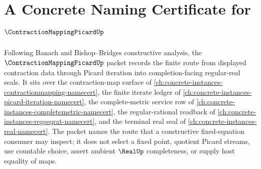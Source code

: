 \chapter{A Concrete Naming Certificate for $\ContractionMappingPicardUp$}
\label{ch:concrete-instances-contraction-mapping-picard-namecert}

Following Banach and Bishop--Bridges constructive analysis, the $\ContractionMappingPicardUp$ packet records the finite route from displayed contraction data through Picard iteration into completion-facing regular-real seals. It sits over the contraction-map surface of \autoref{ch:concrete-instances-contractionmapping-namecert}, the finite iterate ledger of \autoref{ch:concrete-instances-picard-iteration-namecert}, the complete-metric service row of \autoref{ch:concrete-instances-completemetric-namecert}, the regular-rational readback of \autoref{ch:concrete-instances-regseqrat-namecert}, and the terminal real seal of \autoref{ch:concrete-instances-real-namecert}. The packet names the route that a constructive fixed-equation consumer may inspect; it does not select a fixed point, quotient Picard streams, use countable choice, assert ambient $\RealUp$ completeness, or supply host equality of maps.

